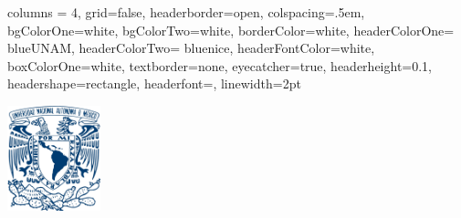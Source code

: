 \documentclass[a0paper,portrait]{baposter}
\begin{document}
	\background{ }
	\begin{poster}{
			columns = 4, 
			grid=false,
			headerborder=open, %
			colspacing=.5em, %
			bgColorOne=white, %
			bgColorTwo=white, %
			borderColor=white,%
			headerColorOne= blueUNAM, %
			headerColorTwo= bluenice, %
			headerFontColor=white,%
			boxColorOne=white, %
			textborder=none, %
			eyecatcher=true, %
			headerheight=0.1\textheight, %
			headershape=rectangle, %
			headerfont=\Large, %
			linewidth=2pt %
		}
		{\includegraphics[width=2.7cm]{logo_unam}
			
}
\end{poster}
\end{document}
